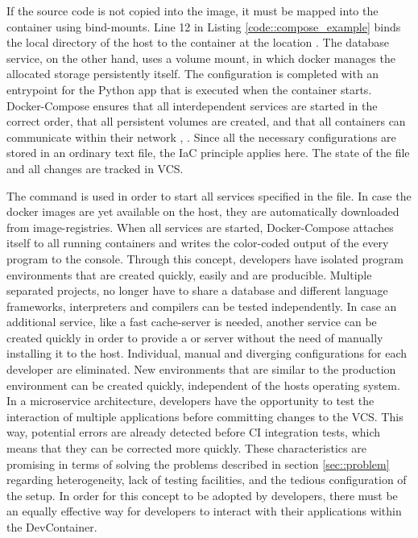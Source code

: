         If the source code is not copied into the image, it must be mapped into the container using bind-mounts. Line 12 in Listing \ref{code::compose_example} binds the local  directory of the host to the container at the location . The database service, on the other hand, uses a volume mount, in which docker manages the allocated storage persistently itself. The configuration is completed with an entrypoint for the Python app that is executed when the container starts.\newline
        Docker-Compose ensures that all interdependent services are started in the correct order, that all persistent volumes are created, and that all containers can communicate within their network \cite{docker2020}, \cite{dockerdocs}. Since all the necessary configurations are stored in an ordinary text file, the \ac{IaC} principle applies here. The state of the  file and all changes are tracked in \ac{VCS}.\newline
        
        The command  is used in order to start all services specified in the  file. In case the docker images are yet available on the host, they are automatically downloaded from image-registries. When all services are started, Docker-Compose attaches itself to all running containers and writes the color-coded output of the every program to the console.\newline
        Through this concept, developers have isolated program environments that are created quickly, easily and are producible. Multiple separated projects, no longer have to share a database and different language frameworks, interpreters and compilers can be tested independently. In case an additional service, like a fast cache-server is needed, another service can be created quickly in order to provide a  or  server without the need of manually installing it to the host. Individual, manual and diverging configurations for each developer are eliminated. New environments that are similar to the production environment can be created quickly, independent of the hosts operating system. In a microservice architecture, developers have the opportunity to test the interaction of multiple applications before committing changes to the \ac{VCS}. This way, potential errors are already detected before \ac{CI} integration tests, which means that they can be corrected more quickly. These characteristics are promising in terms of solving the problems described in section \ref{sec::problem} regarding heterogeneity, lack of testing facilities, and the tedious configuration of the setup. In order for this concept to be adopted by developers, there must be an equally effective way for developers to interact with their applications within the DevContainer.

